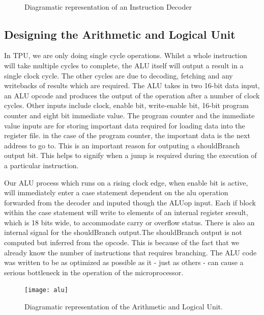 %
%
%
%
%

\begin{figure}[p]
\\
\caption{Diagramatic representation of an Instruction Decoder}
\label{fig:globdecode}
\end{figure}


\subsection{Designing the Arithmetic and Logical Unit}

In TPU, we are only doing single cycle operations. Whilst a whole instruction will take multiple cycles to complete, the ALU itself will output a result in a single clock cycle. The other cycles are due to decoding, fetching and any writebacks of results which are required. The ALU takes in two 16-bit data input, an ALU opcode and produces the output of the operation after a number of clock cycles. 
Other inputs include clock, enable bit, write-enable bit, 16-bit program counter and eight bit immediate value. The program counter and the immediate value inputs are for storing important data required for loading data into the register file. in the case of the program counter, the important data is the next address to go to. This is an important reason for outputing a shouldBranch output bit. This helps to signify when a jump is required during the execution of a particular instruction.

Our ALU process which runs on a rising clock edge, when enable bit is active, will immediately enter a case statement dependent on the alu operation forwarded from the decoder and inputed though the ALUop input. 
Each if block within the case statement will write to elements of an internal register sresult, which is 18 bits wide, to accommodate carry or overflow status. There is also an internal signal for the shouldBranch output.The shouldBranch output is not computed but inferred from the opcode. This is because of the fact that we already know the number of instructions that requires branching. 
The ALU code was written to be as optimized as possible as it - just as others - can cause a serious bottleneck in the operation of the microprocessor.
\begin{figure}[p]
\texttt{[image: alu]}
\centering
\caption{Diagramatic representation of the Arithmetic and Logical Unit.}
\centering
\label{fig:alu}
\end{figure}



